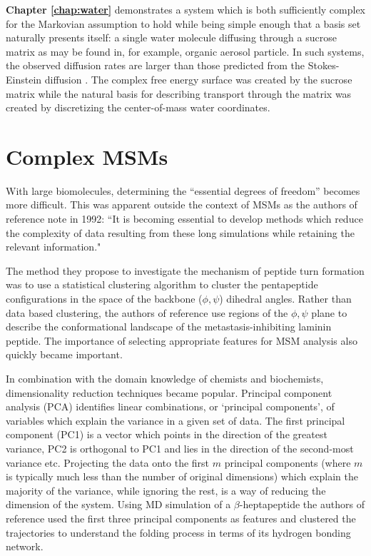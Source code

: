 \textbf{Chapter \ref{chap:water}} demonstrates a system which is both sufficiently complex for the Markovian assumption to hold while being simple enough that a basis set naturally presents itself: a single water molecule diffusing through a sucrose matrix as may be found in, for example, organic aerosol particle\cite{songTransientCavityDynamics2020a}. In such systems, the observed diffusion rates  are larger than those predicted from the Stokes-Einstein diffusion \cite{songTransientCavityDynamics2020a}. The complex free energy surface was created by the sucrose matrix while the natural basis for describing transport through the matrix was created by discretizing the center-of-mass water coordinates. 

\section{Complex MSMs}
With large biomolecules, determining the ``essential degrees of freedom''\cite{schutteDirectApproachConformational1999} becomes more difficult. This was apparent outside the context of MSMs as the authors of  reference \cite{karpen1993statistical} note in 1992: 
``It is becoming essential to develop methods which reduce the complexity of data resulting from these long simulations while retaining the relevant information."

The method they propose to investigate the mechanism of peptide turn formation was to use a statistical clustering algorithm to cluster the pentapeptide configurations in the space of the backbone ($\phi, \psi$) dihedral angles. Rather than data based clustering, the authors of reference \cite{mckelveyCHARMMAnalysisConformations1991} use regions of the $\phi, \psi$ plane to describe the conformational landscape of the metastasis-inhibiting laminin peptide. The importance of selecting appropriate features for MSM analysis also quickly became important. 

In combination with the domain knowledge of chemists and biochemists, dimensionality reduction\cite{friedman2001elements} techniques became popular.  Principal component analysis (PCA)\cite{leverPrincipalComponentAnalysis2017} identifies linear combinations, or `principal components', of variables which explain the variance in a given set of data. The first principal component (PC1) is a vector which points in the direction of the greatest variance, PC2 is orthogonal to PC1 and lies in the direction of the second-most variance etc. Projecting the data onto the first $m$ principal components (where $m$ is typically much less than the number of original dimensions) which explain the majority of the variance, while ignoring the rest, is a way of reducing the dimension of the system. Using MD simulation of a $\beta$-heptapeptide the authors of reference \cite{degrootEssentialDynamicsReversible2001} used the first three principal components as features and clustered the trajectories to understand the folding process in terms of its hydrogen bonding network. 

